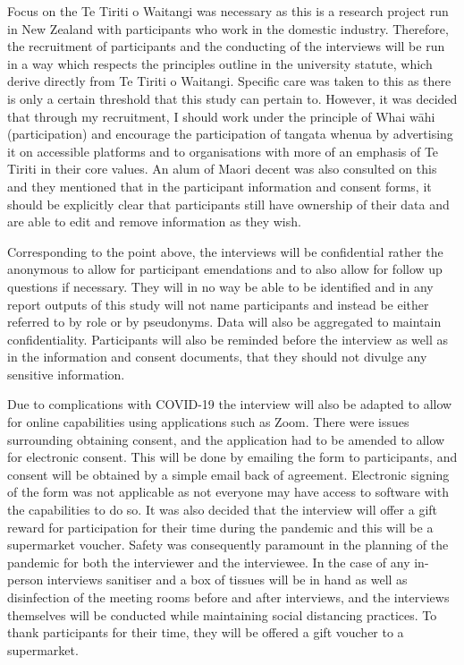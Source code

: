\par Focus on the Te Tiriti o Waitangi was necessary as this is a research project run in New Zealand with participants who work in the domestic industry. Therefore, the recruitment of participants and the conducting of the interviews will be run in a way which respects the principles outline in the university statute, which derive directly from Te Tiriti o Waitangi. Specific care was taken to this as there is only a certain threshold that this study can pertain to. However, it was decided that through my recruitment, I should work under the principle of Whai wāhi (participation) and encourage the participation of tangata whenua by advertising it on accessible platforms and to organisations with more of an emphasis of Te Tiriti in their core values. An alum of Maori decent was also consulted on this and they mentioned that in the participant information and consent forms, it should be explicitly clear that participants still have ownership of their data and are able to edit and remove information as they wish. 
\newline
\par Corresponding to the point above, the interviews will be confidential rather the anonymous to allow for participant emendations and to also allow for follow up questions if necessary. They will in no way be able to be identified and in any report outputs of this study will not name participants and instead be either referred to by role or by pseudonyms. Data will also be aggregated to maintain confidentiality. Participants will also be reminded before the interview as well as in the information and consent documents, that they should not divulge any sensitive information. 
\newline
\par Due to complications with COVID-19 the interview will also be adapted to allow for online capabilities using applications such as Zoom. There were issues surrounding obtaining consent, and the application had to be amended to allow for electronic consent. This will be done by emailing the form to participants, and consent will be obtained by a simple email back of agreement. Electronic signing of the form was not applicable as not everyone may have access to software with the capabilities to do so. It was also decided that the interview will offer a gift reward for participation for their time during the pandemic and this will be a supermarket voucher. Safety was consequently paramount in the planning of the pandemic for both the interviewer and the interviewee. In the case of any in-person interviews sanitiser and a box of tissues will be in hand as well as disinfection of the meeting rooms before and after interviews, and the interviews themselves will be conducted while maintaining social distancing practices. To thank participants for their time, they will be offered a gift voucher to a supermarket.



